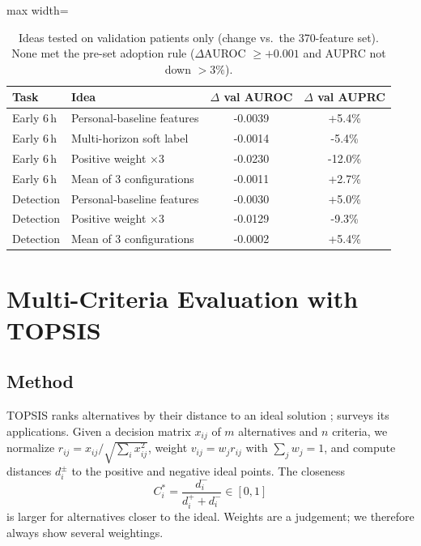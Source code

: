 \documentclass[preprint,12pt]{elsarticle}
\begin{document}


\begin{table}[!t]
\centering\footnotesize\setlength{\tabcolsep}{3pt}
\caption{Ideas tested on validation patients only (change vs.\ the 370-feature set). None met the pre-set adoption rule ($\Delta$AUROC $\ge +0.001$ and AUPRC not down $>3\%$).}
\label{tab:negative}
\begin{adjustbox}{max width=\linewidth}
\begin{tabular}{llcc}
\toprule
Task & Idea & $\Delta$ val AUROC & $\Delta$ val AUPRC \\
\midrule
Early 6\,h & Personal-baseline features & -0.0039 & +5.4\% \\
Early 6\,h & Multi-horizon soft label & -0.0014 & -5.4\% \\
Early 6\,h & Positive weight $\times$3 & -0.0230 & -12.0\% \\
Early 6\,h & Mean of 3 configurations & -0.0011 & +2.7\% \\
\midrule
Detection & Personal-baseline features & -0.0030 & +5.0\% \\
Detection & Positive weight $\times$3 & -0.0129 & -9.3\% \\
Detection & Mean of 3 configurations & -0.0002 & +5.4\% \\
\bottomrule
\end{tabular}
\end{adjustbox}
\end{table}


\section{Multi-Criteria Evaluation with TOPSIS}
\label{sec:topsis}
\subsection{Method}
\label{sec:topsis_method}
TOPSIS ranks alternatives by their distance to an ideal solution \cite{hwang1981}; \cite{behzadian2012} surveys its applications. Given a decision matrix $x_{ij}$ of $m$ alternatives and $n$ criteria, we normalize $r_{ij}=x_{ij}/\sqrt{\sum_i x_{ij}^2}$, weight $v_{ij}=w_j r_{ij}$ with $\sum_j w_j=1$, and compute distances $d_i^{\pm}$ to the positive and negative ideal points. The closeness
\begin{equation}
C_i^{*}=\frac{d_i^{-}}{d_i^{+}+d_i^{-}}\in[0,1]
\end{equation}
is larger for alternatives closer to the ideal. Weights are a judgement; we therefore always show several weightings.
\end{document}
